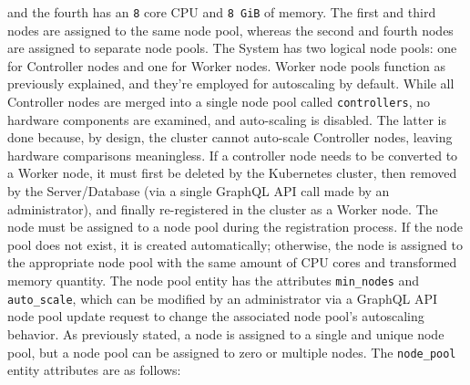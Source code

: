 and the fourth has an \texttt{8} core CPU and \texttt{8 GiB} of memory. The
first and third nodes are assigned to the same node pool, whereas the second and
fourth nodes are assigned to separate node pools.
\newline
The System has two logical node pools: one for Controller nodes and one for Worker
nodes. Worker node pools function as previously explained, and they're employed for
autoscaling by default. While all Controller nodes are merged into a single node
pool called \texttt{controllers}, no hardware components are examined, and auto-scaling
is disabled. The latter is done because, by design, the cluster cannot auto-scale
Controller nodes, leaving hardware comparisons meaningless. If a controller node
needs to be converted to a Worker node, it must first be deleted by the Kubernetes
cluster, then removed by the Server/Database (via a single GraphQL API call made
by an administrator), and finally re-registered in the cluster as a Worker node.
\newline
The node must be assigned to a node pool during the registration process. If the
node pool does not exist, it is created automatically; otherwise, the node is
assigned to the appropriate node pool with the same amount of CPU cores and
transformed memory quantity.
\newline
The node pool entity has the attributes \texttt{min\_nodes} and \texttt{auto\_scale},
which can be modified by an administrator via a GraphQL API node pool update
request to change the associated node pool's autoscaling behavior.
\newline
As previously stated, a node is assigned to a single and unique node pool, but a
node pool can be assigned to zero or multiple nodes.
\newline
The \texttt{node\_pool} entity attributes are as follows:

